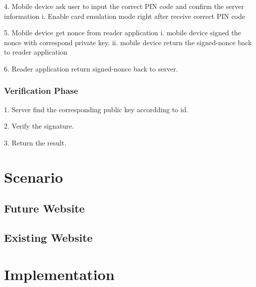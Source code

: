 \begin{CJK}{Bg5}{bsmi}
	4. Mobile device ask user to input the correct PIN code and confirm the server information
		i.	Enable card emulation mode right after receive correct PIN code

	5. Mobile device get nonce from reader application
		i.	mobile device signed the nonce with correspond private key.
		ii.	mobile device return the signed-nonce back to reader application

	6. Reader application return signed-nonce back to server.

\subsubsection{Verification Phase}

	1. Server find the corresponding public key accordding to id.

	2. Verify the signature.

	3. Return the result.

\section{Scenario}

\subsection{Future Website}

\subsection{Existing Website}

\section{Implementation}

\end{CJK}